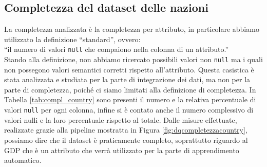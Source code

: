 \subsection{Completezza del dataset delle nazioni}
\label{subsec:compl_country}
La completezza analizzata è la completezza per attributo, in particolare abbiamo utilizzato la definizione “standard”, ovvero:\\“il numero di valori  \texttt{null} che compaiono nella colonna di un attributo.”\\
Stando alla definizione, non abbiamo ricercato possibili valori non \texttt{null} ma i quali non possegono valori semantici corretti rispetto all'attributo.
Questa casistica è stata analizzata e studiata per la parte di integrazione dei dati, ma non per la parte di completezza, poiché ci siamo limitati alla definizione di completezza. 
In Tabella \ref{tab:compl_country} sono presenti il numero e la relativa percentuale di valori \texttt{null} per ogni colonna, infine si è contato anche il numero complessivo di valori nulli e la loro percentuale rispetto al totale.
Dalle misure effettuate, realizzate grazie alla pipeline mostratta in Figura \ref{fig:dqcompletezzacountry}, possiamo dire che il dataset è praticamente completo, soprattutto riguardo al GDP che è un attributo che verrà utilizzato per la parte di apprendimento automatico.
